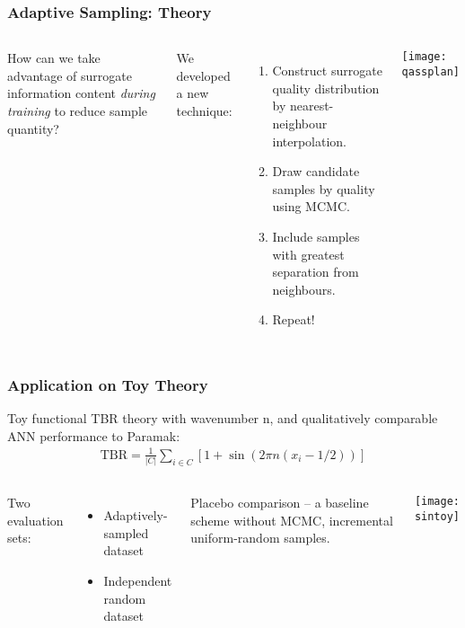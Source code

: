 \begin{frame}
	\frametitle{Adaptive Sampling: Theory}
	 \begin{columns}[onlytextwidth,T]
      \column{\dimexpr\linewidth-6cm-5mm}
        
        How can we take advantage of surrogate information content \textit{during training} to reduce sample quantity? \newline
        
        We developed a new technique:
        \vspace{-5pt}
        \begin{enumerate}
        \item Construct surrogate quality distribution by nearest- neighbour interpolation.
        \item Draw candidate samples by quality using MCMC.
        \item Include samples with greatest separation from neighbours.
        \item Repeat!
        \end{enumerate}
      \column{6cm}
      \texttt{[image: qassplan]}

    \end{columns}
\end{frame}

\begin{frame}
	\frametitle{Application on Toy Theory}
	Toy functional TBR theory with wavenumber n, and qualitatively comparable ANN performance to Paramak:
	\begin{align*}
		\text{TBR} = \frac{1}{|C|}\sum_{i \in C} \left[1 + \sin(2\pi n (x_i - 1/2)) \right]
	\end{align*}

	\vspace{1em}

	\begin{columns}[T]
		\column{0.5\paperwidth}
		\vspace{0.5em}
		Two evaluation sets:
		\begin{itemize}
		    \item Adaptively-sampled dataset
		    \item Independent random dataset
		\end{itemize}
		\vspace{15pt}

		Placebo comparison -- a baseline scheme without MCMC, incremental uniform-random samples.


		\column{0.4\paperwidth}
		\texttt{[image: sintoy]}

	\end{columns}
\end{frame}

